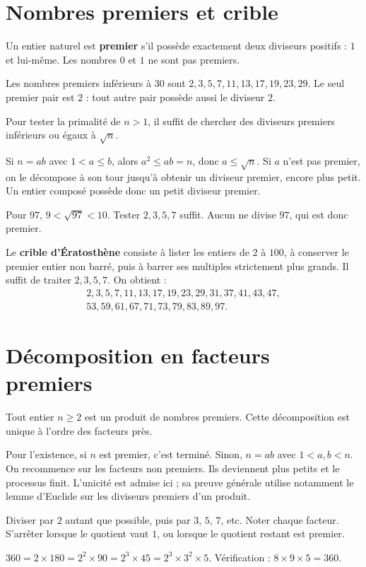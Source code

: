\documentclass[../cours_3e.tex]{subfiles}
\begin{document}
\section{Nombres premiers et crible}
\begin{definition}
Un entier naturel est \textbf{premier} s'il possède exactement deux diviseurs positifs : $1$ et lui-même. Les nombres $0$ et $1$ ne sont pas premiers.
\end{definition}
Les nombres premiers inférieurs à $30$ sont $2,3,5,7,11,13,17,19,23,29$. Le seul premier pair est $2$ : tout autre pair possède aussi le diviseur $2$.
\begin{propriete}
Pour tester la primalité de $n>1$, il suffit de chercher des diviseurs premiers inférieurs ou égaux à $\sqrt n$.
\end{propriete}
\begin{demonstration}
Si $n=ab$ avec $1<a\leq b$, alors $a^2\leq ab=n$, donc $a\leq\sqrt n$. Si $a$ n'est pas premier, on le décompose à son tour jusqu'à obtenir un diviseur premier, encore plus petit. Un entier composé possède donc un petit diviseur premier.
\end{demonstration}
\begin{exemple}
Pour $97$, $9<\sqrt{97}<10$. Tester $2,3,5,7$ suffit. Aucun ne divise $97$, qui est donc premier.
\end{exemple}
Le \textbf{crible d'Ératosthène} consiste à lister les entiers de $2$ à $100$, à conserver le premier entier non barré, puis à barrer ses multiples strictement plus grands. Il suffit de traiter $2,3,5,7$. On obtient :
\[
\begin{gathered}
2,3,5,7,11,13,17,19,23,29,31,37,41,43,47,\\
53,59,61,67,71,73,79,83,89,97.
\end{gathered}
\]

\section{Décomposition en facteurs premiers}
\begin{theoreme}
Tout entier $n\geq2$ est un produit de nombres premiers. Cette décomposition est unique à l'ordre des facteurs près.
\end{theoreme}
\begin{demonstration}
Pour l'existence, si $n$ est premier, c'est terminé. Sinon, $n=ab$ avec $1<a,b<n$. On recommence sur les facteurs non premiers. Ils deviennent plus petits et le processus finit. L'unicité est admise ici ; sa preuve générale utilise notamment le lemme d'Euclide sur les diviseurs premiers d'un produit.
\end{demonstration}
\begin{methode}
Diviser par $2$ autant que possible, puis par $3$, $5$, $7$, etc. Noter chaque facteur. S'arrêter lorsque le quotient vaut $1$, ou lorsque le quotient restant est premier.
\end{methode}
\begin{exemple}
$360=2\times180=2^2\times90=2^3\times45=2^3\times3^2\times5$.
Vérification : $8\times9\times5=360$.
\end{exemple}
\end{document}

